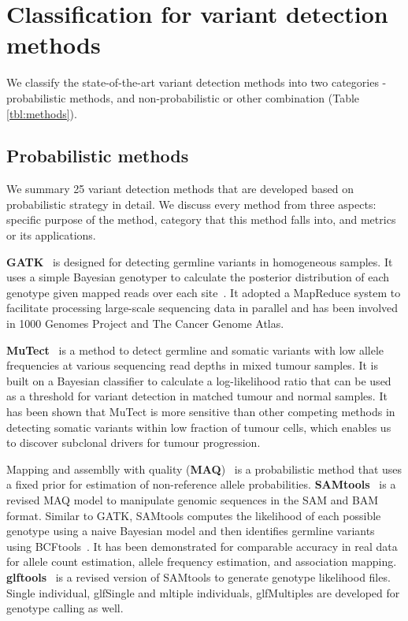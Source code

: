 \documentclass[a4,center,fleqn]{NAR}
\begin{document}
\section{Classification for variant detection methods}

We classify the state-of-the-art variant detection methods into two categories - probabilistic methods, and non-probabilistic or other combination (Table \ref{tbl:methods}).



\subsection{Probabilistic methods}

We summary 25 variant detection methods that are developed based on probabilistic strategy in detail.
We discuss every method from three aspects: specific purpose of the method, category that this method falls into, and metrics or its applications.

\textbf{GATK}~\citep{McKenna2010} is designed for detecting germline variants in homogeneous samples.
It uses a simple Bayesian genotyper to calculate the posterior distribution of each genotype given mapped reads over each site~\citep{depristo2011framework}.
It adopted a MapReduce system to facilitate processing large-scale sequencing data in parallel and has been involved in 1000 Genomes Project and The Cancer Genome Atlas.

\textbf{MuTect}~\citep{Cibulskis2013} is a method to detect germline and somatic variants with low allele frequencies at various sequencing read depths in mixed tumour samples.
It is built on a Bayesian classifier to calculate a log-likelihood ratio that can be used as a threshold for variant detection in matched tumour and normal samples.
It has been shown that MuTect is more sensitive than other competing methods in detecting somatic variants within low fraction of tumour cells, which enables us to discover subclonal drivers for tumour progression.

Mapping and assemblly with quality (\textbf{MAQ})~\citep{Li2008} is a probabilistic method that uses a fixed prior for estimation of non-reference allele probabilities.
\textbf{SAMtools}~\citep{Li2009a} is a revised MAQ model to manipulate genomic sequences in the SAM and BAM format.
Similar to GATK, SAMtools computes the likelihood of each possible genotype using a naive Bayesian model and then identifies germline variants using BCFtools~\citep{li2011statistical}.
It has been demonstrated for comparable accuracy in real data for allele count estimation, allele frequency estimation, and association mapping.
\textbf{glftools}~\citep{abecasis2010} is a revised version of SAMtools to generate genotype likelihood files.
Single individual, glfSingle and mltiple individuals, glfMultiples are developed for genotype calling as well.
\end{document}
